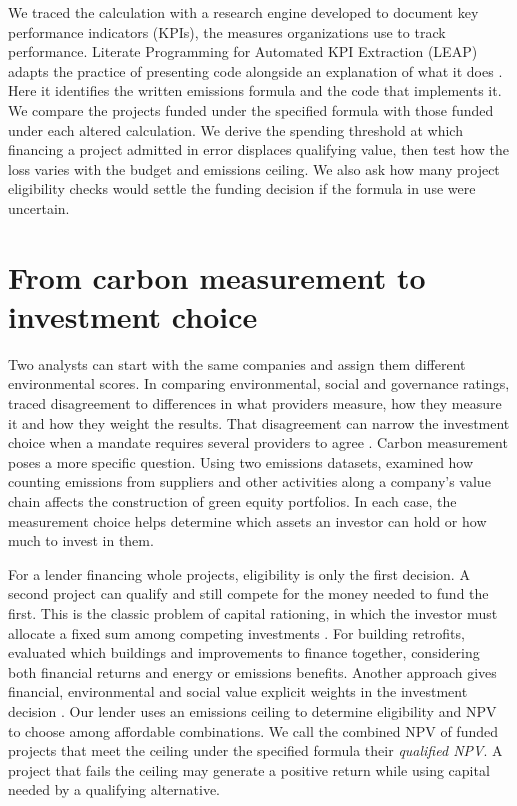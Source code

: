 \documentclass[ijfs,article,submit,oneauthor]{Definitions/mdpi}
\begin{document}
We traced the calculation with a research engine developed to document key performance indicators (KPIs), the measures organizations use to track performance. Literate Programming for Automated KPI Extraction (LEAP) adapts the practice of presenting code alongside an explanation of what it does \citep{knuth,zenodo,leap}. Here it identifies the written emissions formula and the code that implements it. We compare the projects funded under the specified formula with those funded under each altered calculation. We derive the spending threshold at which financing a project admitted in error displaces qualifying value, then test how the loss varies with the budget and emissions ceiling. We also ask how many project eligibility checks would settle the funding decision if the formula in use were uncertain.

\section{From carbon measurement to investment choice}
Two analysts can start with the same companies and assign them different environmental scores. In comparing environmental, social and governance ratings, \citet{berg} traced disagreement to differences in what providers measure, how they measure it and how they weight the results. That disagreement can narrow the investment choice when a mandate requires several providers to agree \citep{lohmann}. Carbon measurement poses a more specific question. Using two emissions datasets, \citet{anquetin} examined how counting emissions from suppliers and other activities along a company's value chain affects the construction of green equity portfolios. In each case, the measurement choice helps determine which assets an investor can hold or how much to invest in them.

For a lender financing whole projects, eligibility is only the first decision. A second project can qualify and still compete for the money needed to fund the first. This is the classic problem of capital rationing, in which the investor must allocate a fixed sum among competing investments \citep{lorie}. For building retrofits, \citet{he} evaluated which buildings and improvements to finance together, considering both financial returns and energy or emissions benefits. Another approach gives financial, environmental and social value explicit weights in the investment decision \citep{schoenmaker}. Our lender uses an emissions ceiling to determine eligibility and NPV to choose among affordable combinations. We call the combined NPV of funded projects that meet the ceiling under the specified formula their \emph{qualified NPV}. A project that fails the ceiling may generate a positive return while using capital needed by a qualifying alternative.
\end{document}
